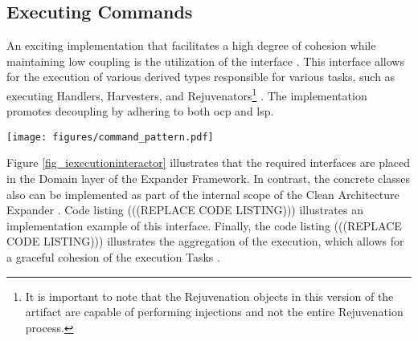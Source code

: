 \subsection{Executing Commands} \label{subsec_IExecutionInteractorObject}

An exciting implementation that facilitates a high degree of cohesion while maintaining
low coupling is the utilization of the  interface
\parencite{koks_iexecutioninteractor_2023}. This interface allows for the execution of
various derived types responsible for various tasks, such as executing Handlers,
Harvesters, and Rejuvenators\footnote{It is important to note that the Rejuvenation
objects in this version of the artifact are capable of performing injections and not the
entire Rejuvenation process.} \parencites{koks_expandentitieshandlerinteractor_2023,
koks_regionharvesterinteractor_2023, koks_regionrejuvenatorinteractor_2023}. The
implementation promotes decoupling by adhering to both \gls{ocp} and \gls{lsp}.

\begin{figure*}[htbp]
    \centering
    \texttt{[image: figures/command\_pattern.pdf]}
    \caption[Low coupling with ]{Low coupling with }
    \label{fig_iexecutioninteractor}
  \end{figure*}


Figure \ref{fig_iexecutioninteractor} illustrates that the required interfaces are placed
in the Domain layer of the Expander Framework. In contrast, the concrete classes also can
be implemented as part of the internal scope of the Clean Architecture Expander
\parencite{koks_migrationharvesterinteractor_2023}. Code listing
(((REPLACE CODE LISTING))) illustrates an implementation example of
this interface. Finally, the code listing (((REPLACE CODE LISTING)))
illustrates the aggregation of the execution, which allows for a graceful cohesion of the
execution Tasks \parencite{koks_codegeneratorinteractor_2023}.
